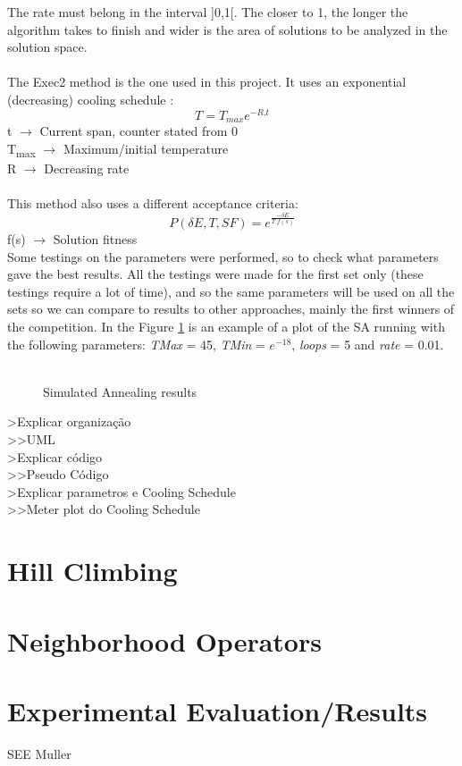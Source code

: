 The rate must belong in the interval ]0,1[. The closer to 1, the longer the algorithm takes to finish and wider is the area of solutions to be analyzed in the solution space.\\
\\
The Exec2 method is the one used in this project. It uses an exponential (decreasing) cooling schedule \cite{CarvalhoLisbonNovember2004}:\\
\[T = T_{max}e^{-R.t} \]
t $\rightarrow$ Current span, counter stated from 0\\
T\textsubscript{max} $\rightarrow$ Maximum/initial temperature\\
R $\rightarrow$ Decreasing rate\\
\\
This method also uses a different acceptance criteria:\\
\[P(\delta E, T, SF) = e^{\frac{-\delta E}{T.f(s)}} \]
f(s) $\rightarrow$ Solution fitness\\

Some testings on the parameters were performed, so to check what parameters gave the best results. All the testings were made for the first set only (these testings require a lot of time), and so the same parameters will be used on all the sets so we can compare to results to other approaches, mainly the first winners of the competition. 
In the Figure \ref{fig:SimulatedAnnealingPlot} is an example of a plot of the SA running with the following parameters: \textit{TMax} = 45, \textit{TMin} = $e^{-18}$, \textit{loops} = 5 and \textit{rate} = 0.01.\\
\\
\begin{figure}[!b]
\centering


\caption{Simulated Annealing results} 
\label{fig:SimulatedAnnealingPlot}
\end{figure}
>Explicar organização\\
>>UML\\
>Explicar código\\
>>Pseudo Código\\
>Explicar parametros e Cooling Schedule\\
>>Meter plot do Cooling Schedule



\section{Hill Climbing}
\label{sec:HillClimbing}

\section{Neighborhood Operators}
\label{sec:NeighborhoodOperators}

\section{Experimental Evaluation/Results}

SEE Muller


